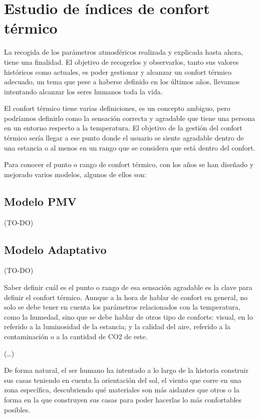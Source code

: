 \chapter{Estudio de índices de confort térmico}

La recogida de los parámetros atmosféricos realizada y explicada hasta ahora, tiene una finalidad. El objetivo de recogerlos y observarlos, tanto sus valores históricos como actuales, es poder gestionar y alcanzar un confort térmico adecuado, un tema que pese a haberse definido en los últimos años, llevamos intentando alcanzar los seres humanos toda la vida.

El confort térmico tiene varias definiciones, es un concepto ambiguo, pero podríamos definirlo como la sensación correcta y agradable que tiene una persona en un entorno respecto a la temperatura. El objetivo de la gestión del confort térmico sería llegar a ese punto donde el usuario se siente agradable dentro de una estancia o al menos en un rango que se considera que está dentro del confort.

Para conocer el punto o rango de confort térmico, con los años se han diseñado y mejorado varios modelos, algunos de ellos son:

\section{Modelo PMV}

(TO-DO)

\section{Modelo Adaptativo}

(TO-DO)

Saber definir cuál es el punto o rango de esa sensación agradable es la clave para definir el confort térmico. Aunque a la hora de hablar de confort en general, no solo se debe tener en cuenta los parámetros relacionados con la temperatura, como la humedad, sino que se debe hablar de otros tipo de conforts: visual, en lo referido a la luminosidad de la estancia; y la calidad del aire, referido a la contaminación o a la cantidad de CO2 de este.

(…)

De forma natural, el ser humano ha intentado a lo largo de la historia construir sus casas teniendo en cuenta la orientación del sol, el viento que corre en una zona específica, descubriendo qué materiales son más aislantes que otros o la forma en la que construyen sus casas para poder hacerlas lo más confortables posibles.